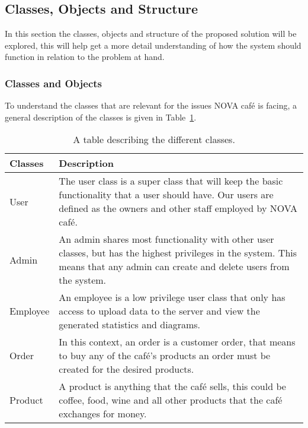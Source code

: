 \subsection{Classes, Objects and Structure}\label{subsec:classes-objects-and-structure}

In this section the classes, objects and structure of the proposed solution will be explored, this
will help get a more detail understanding of how the system should function in relation to the problem at hand.

\subsubsection{Classes and Objects}\label{subsubsec:classes-and-objects}

To understand the classes that are relevant for the issues NOVA café is facing,
a general description of the classes is given in Table~\ref{tab:class-table}.

\begin{table}[H]
    \centering
    \begin{tabular} { m{2.5cm} m{10cm} }
        \toprule
        \textbf{Classes} & \textbf{Description} \\
        \midrule
        User & The user class is a super class that will keep the
        basic functionality that a user should have.
        Our users are defined as the owners and other staff employed by NOVA café. \\
        \midrule
        Admin & An admin shares most functionality with other user classes,
        but has the highest privileges in the system.
        This means that any admin can create and delete users from the system. \\
        \midrule
        Employee & An employee is a low privilege user class
        that only has access to upload data to the server and
        view the generated statistics and diagrams. \\
        \midrule
        Order & In this context, an order is a customer order,
        that means to buy any of the café's products an order must be created
        for the desired products. \\
        \midrule
        Product & A product is anything that the café sells,
        this could be coffee, food, wine and all other products that
        the café exchanges for money. \\
        \bottomrule
    \end{tabular}
    \caption{A table describing the different classes.
    }\label{tab:class-table}
\end{table}

